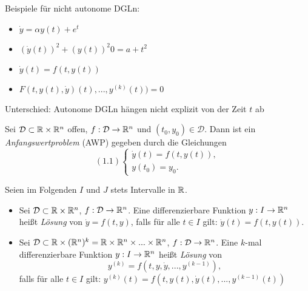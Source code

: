 \documentclass{cheat-sheet}
\newcommand{\D}{\mathcal{D}}
\begin{document}
Beispiele für nicht autonome DGLn:
\begin{itemize}
  \item $\dot{y} = \alpha y(t) + e^{t}$
  \item $(\dot{y}(t))^2 + (y(t))^2 0= a + t^2$
  \item $\dot{y}(t) = f(t, y(t))$
  \item $F(t, y(t), \dot{y})(t), ..., y^{(k)}(t)) = 0$
\end{itemize}

Unterschied: Autonome DGLn hängen nicht explizit von der Zeit $t$ ab
\fi

\begin{defn}
  Sei $\D \subset \R \times \R^n$ offen, $f : \D \to \R^n$ und $(t_0, y_0) \in \D$. Dann ist ein \emph{Anfangswertproblem} (AWP) gegeben durch die Gleichungen
  \[
    (1.1) \left\{ \begin{array}{ll}
      \dot{y}(t) = f(t, y(t)), \\
      y(t_0) = y_0.
    \end{array} \right.
  \]
\end{defn}

\begin{nota}
  Seien im Folgenden $I$ und $J$ stets Intervalle in $\mathbb{R}$.
\end{nota}

\begin{defn}
  \begin{itemize}
    \item Sei $\D \subset \R \times \R^n$, $f : \D \to \R^n$. Eine differenzierbare Funktion $y : I \to \mathbb{R}^n$ heißt \emph{Lösung} von $\dot{y} = f(t, y)$, falls für alle $t \in I$ gilt: $\dot{y}(t) = f(t, y(t))$.
    \item Sei $\D \subset \R \times (\R^n)^k = \R \times \R^n \times ... \times \R^n$, $f : \D \to \R^n$. Eine $k$-mal differenzierbare Funktion $y : I \to \mathbb{R}^n$ heißt \emph{Lösung} von
    \[ y^{(k)} = f(t, y, \dot{y}, ..., y^{(k-1)}), \tag{1.2} \]
    falls für alle $t \in I$ gilt:
    $y^{(k)}(t) = f(t, y(t), \dot{y}(t), ..., y^{(k-1)}(t))$
  \end{itemize}
\end{defn}
\end{document}
